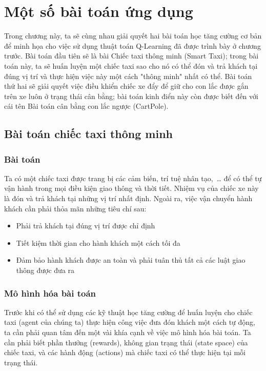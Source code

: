 \chapter{Một số bài toán ứng dụng}
\label{ch:05}

Trong chương này, ta sẽ cùng nhau giải quyết
hai bài toán học tăng cường cơ bản để minh họa cho việc
sử dụng thuật toán Q-Learning đã được trình bày ở chương trước.
Bài toán đầu tiên sẽ là bài Chiếc taxi thông minh (Smart Taxi);
trong bài toán này, ta sẽ huấn luyện một chiếc taxi
sao cho nó có thể đón và trả khách tại đúng vị trí
và thực hiện việc này một cách "thông minh" nhất có thể.
Bài toán thứ hai sẽ giải quyết việc điều khiển
chiếc xe đẩy để giữ cho con lắc được gắn trên xe
luôn ở trạng thái cân bằng; bài toán kinh điển này còn
được biết đến với cái tên Bài toán cân bằng con lắc ngược (CartPole).

\section{Bài toán chiếc taxi thông minh}
\subsection{Bài toán}
Ta có một chiếc taxi được trang bị các cảm biến, trí tuệ nhân tạo,~\dots\space
để có thể tự vận hành trong mọi điều kiện giao thông và thời tiết.
Nhiệm vụ của chiếc xe này là đón và trả khách tại những vị trí nhất định.
Ngoài ra, việc vận chuyển hành khách cần phải thỏa mãn những tiêu chí sau:
\begin{itemize}
    \item Phải trả khách tại đúng vị trí được chỉ định
    \item Tiết kiệm thời gian cho hành khách một cách tối đa
    \item Đảm bảo hành khách được an toàn và phải tuân thủ tất cả các luật giao thông được đưa ra
\end{itemize}

\subsection{Mô hình hóa bài toán}
Trước khi có thể sử dụng các kỹ thuật học tăng cường
để huấn luyện cho chiếc taxi (agent của chúng ta)
thực hiện công việc đưa đón khách một cách tự động,
ta cần phải quan tâm đến một vài khía cạnh
về việc mô hình hóa bài toán.
Ta cần phải biết phần thưởng (rewards),
không gian trạng thái (state space) của chiếc taxi,
và các hành động (actions) mà chiếc taxi
có thể thực hiện tại mỗi trạng thái.

